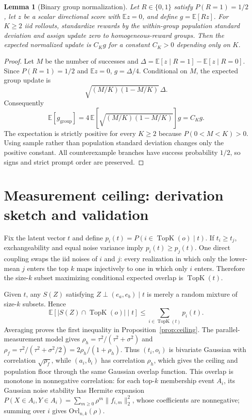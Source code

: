 \documentclass[11pt]{article}
\newtheorem{lemma}{Lemma}
\begin{document}
\begin{lemma}[Binary group normalization]
\label{lem:groupnorm}
Let $R\in\{0,1\}$ satisfy $P(R=1)=1/2$, let $z$ be a scalar directional score
with $\mathbb E z=0$, and define $g=\mathbb E[Rz]$. For $K\ge2$ iid rollouts,
standardize rewards by the within-group population standard deviation and
assign update zero to homogeneous-reward groups. Then the expected normalized
update is $C_Kg$ for a constant $C_K>0$ depending only on $K$.
\end{lemma}
\begin{proof}
Let $M$ be the number of successes and
$\Delta=\mathbb E[z\mid R=1]-\mathbb E[z\mid R=0]$. Since
$P(R=1)=1/2$ and $\mathbb Ez=0$, $g=\Delta/4$. Conditional on $M$,
the expected group update is
\[
\sqrt{(M/K)(1-M/K)}\,\Delta.
\]
Consequently
\[
\mathbb E[g_{\mathrm{group}}]
=4\,\mathbb E\!\left[\sqrt{(M/K)(1-M/K)}\right]g=C_Kg.
\]
The expectation is strictly positive for every $K\ge2$ because
$P(0<M<K)>0$. Using sample rather than population standard deviation changes
only the positive constant. All counterexample branches have success
probability $1/2$, so signs and strict prompt order are preserved.
\end{proof}

\section{Measurement ceiling: derivation sketch and validation}
\label{app:ceiling}

Fix the latent vector $t$ and define
$p_i(t)=P(i\in\operatorname{TopK}(o)\mid t)$. If $t_i\ge t_j$, exchangeability
and equal noise variance imply $p_i(t)\ge p_j(t)$. One direct coupling swaps
the iid noises of $i$ and $j$: every realization in which only the lower-mean
$j$ enters the top $k$ maps injectively to one in which only $i$ enters.
Therefore the size-$k$ subset maximizing conditional expected overlap is
$\operatorname{TopK}(t)$.

Given $t$, any $S(Z)$ satisfying $Z\perp(e_a,e_b)\mid t$ is merely a random
mixture of size-$k$ subsets. Hence
\[
\mathbb E[|S(Z)\cap\operatorname{TopK}(o)|\mid t]
\le \sum_{i\in\operatorname{TopK}(t)}p_i(t).
\]
Averaging proves the first inequality in Proposition~\ref{prop:ceiling}.
The parallel-measurement model gives
$\rho_h=\tau^2/(\tau^2+\sigma^2)$ and
$\rho_f=\tau^2/(\tau^2+\sigma^2/2)=2\rho_h/(1+\rho_h)$.
Thus $(t_i,o_i)$ is bivariate Gaussian with correlation $\sqrt{\rho_f}$,
while $(a_i,b_i)$ has correlation $\rho_h$, which gives the ceiling and
population floor through the same Gaussian overlap function. This overlap is
monotone in nonnegative correlation: for each top-$k$ membership event $A_i$,
its Gaussian noise stability has Hermite expansion
$P(X\in A_i,Y\in A_i)=\sum_{m\ge0}\rho^m\|f_{i,m}\|_2^2$, whose coefficients
are nonnegative; summing over $i$ gives $\mathrm{Ovl}_{n,k}(\rho)$.
\end{document}
